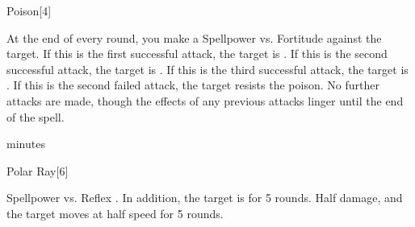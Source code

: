 \begin{spellsection}{Poison}[4]
    \begin{spellheader}
    \end{spellheader}
    \begin{spellcontent}
        \begin{spelltargetinginfo}
        \end{spelltargetinginfo}
        \begin{spelleffects}
            \begin{spellattacktriggered}{At the end of every round, you make a Spellpower vs. Fortitude against the target.}
                \spellsuccess If this is the first successful attack, the target is \sickened. If this is the second successful attack, the target is \nauseated. If this is the third successful attack, the target is \paralyzed.
                \spellfailure If this is the second failed attack, the target resists the poison. No further attacks are made, though the effects of any previous attacks linger until the end of the spell.
            \end{spellattacktriggered}
             minutes
        \end{spelleffects}
    \end{spellcontent}
    \begin{spellfooter}
        \spellnotes \physicalspellnotes
        \miscastrandom
    \end{spellfooter}
\end{spellsection}

\begin{spellsection}{Polar Ray}[6]
    \begin{spellheader}
    \end{spellheader}
    \begin{spellcontent}
        \begin{spelltargetinginfo}
        \end{spelltargetinginfo}
        \begin{spelleffects}
            \begin{spellattack}{Spellpower vs. Reflex}
                \spellsuccess {}. In addition, the target is \slowed for 5 rounds.
                \spellfailure Half damage, and the target moves at half speed for 5 rounds.
            \end{spellattack}
        \end{spelleffects}
    \end{spellcontent}
    \begin{spellfooter}
        \miscastrandom
    \end{spellfooter}
\end{spellsection}

